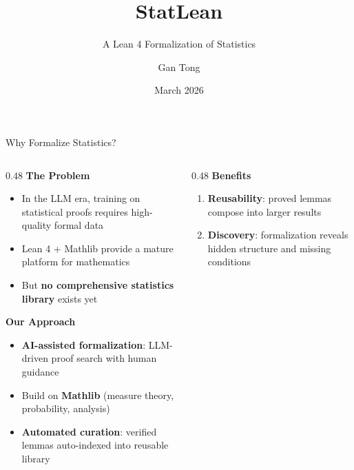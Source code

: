 \documentclass[aspectratio=169, 10pt]{beamer}
\title{\textbf{StatLean}}
\subtitle{A Lean 4 Formalization of Statistics}
\author{Gan Tong}
\date{March 2026}
\institute{Department of Statistics and Data Science\\National University of Singapore}
\begin{document}
\begin{frame}[plain]
\titlepage
\end{frame}

\begin{frame}{Why Formalize Statistics?}

\begin{columns}[T]
\begin{column}{0.48\textwidth}
\textbf{The Problem}
\begin{itemize}
  \item In the LLM era, training on statistical proofs requires high-quality formal data
  \item Lean 4 + Mathlib provide a mature platform for mathematics
  \item But \textbf{no comprehensive statistics library} exists yet
\end{itemize}
\vspace{0.5em}
\textbf{Our Approach}
\begin{itemize}
  \item \textbf{AI-assisted formalization}: LLM-driven proof search with human guidance
  \item Build on \textbf{Mathlib} (measure theory, probability, analysis)
  \item \textbf{Automated curation}: verified lemmas auto-indexed into reusable library
\end{itemize}
\end{column}
\begin{column}{0.48\textwidth}
\textbf{Benefits}
\begin{enumerate}
  \item \textbf{Reusability}: proved lemmas compose into larger results
  \item \textbf{Discovery}: formalization reveals hidden structure and missing conditions
\end{enumerate}
\end{column}
\end{columns}

\end{frame}
\end{document}
